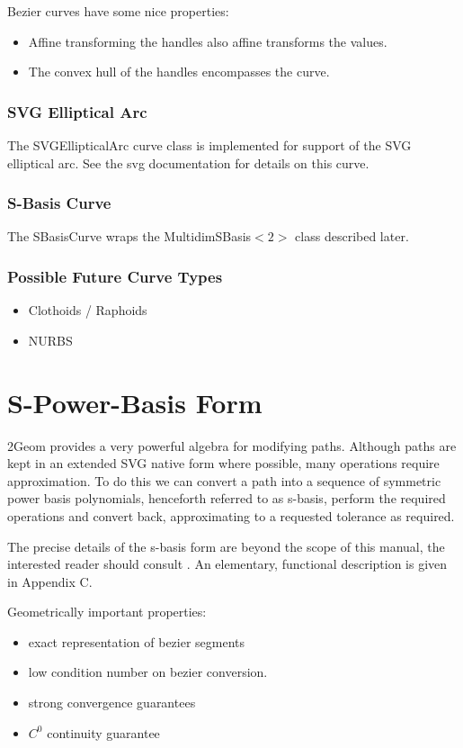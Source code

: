 \documentclass[openany]{book}
\newcommand{\code}[1]{\textsf{#1}}
\begin{document}
Bezier curves have some nice properties:
\begin{itemize}
\item Affine transforming the handles also affine transforms the values.
\item The convex hull of the handles encompasses the curve.
\end{itemize}

\subsection{SVG Elliptical Arc}
The \code{SVGEllipticalArc} curve class is implemented for support of
the SVG elliptical arc.  See the svg documentation for details on this
curve.

\subsection{S-Basis Curve}
The \code{SBasisCurve} wraps the \code{MultidimSBasis$<2>$} class
described later.

\subsection{Possible Future Curve Types}
\begin{itemize}
\item Clothoids / Raphoids
\item NURBS
\end{itemize}

\chapter{S-Power-Basis Form}

2Geom provides a very powerful algebra for modifying paths.  Although
paths are kept in an extended SVG native form where possible, many
operations require approximation.  To do this we can convert a path
into a sequence of symmetric power basis polynomials, henceforth
referred to as s-basis, perform the required operations and convert
back, approximating to a requested tolerance as required.

The precise details of the s-basis form are beyond the scope of this
manual, the interested reader should consult \cite{SanchezReyes1997,SanchezReyes2000,SanchezReyes2001,SanchezReyes2003,SanchezReyes2005}.
An elementary, functional description is given in Appendix C.

Geometrically important properties:
\begin{itemize}
\item exact representation of bezier segments
\item low condition number on bezier conversion.
\item strong convergence guarantees
\item $C^0$ continuity guarantee
\end{itemize}
\end{document}
